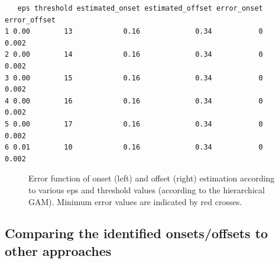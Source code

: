 \documentclass[
  doc,
  floatsintext,
  longtable,
  a4paper,
  nolmodern,
  notxfonts,
  notimes,
  colorlinks=true,linkcolor=blue,citecolor=blue,urlcolor=blue]{apa7}
\begin{document}
\begin{verbatim}
   eps threshold estimated_onset estimated_offset error_onset error_offset
1 0.00        13            0.16             0.34           0        0.002
2 0.00        14            0.16             0.34           0        0.002
3 0.00        15            0.16             0.34           0        0.002
4 0.00        16            0.16             0.34           0        0.002
5 0.00        17            0.16             0.34           0        0.002
6 0.01        10            0.16             0.34           0        0.002
\end{verbatim}

\begin{figure}[!htb]

\caption{\label{fig-onset-error}Error function of onset (left) and
offset (right) estimation according to various eps and threshold values
(according to the hierarchical GAM). Minimum error values are indicated
by red crosses.}


\end{figure}%

\newpage

\subsection{Comparing the identified onsets/offsets to other
approaches}\label{comparing-the-identified-onsetsoffsets-to-other-approaches}
\end{document}
